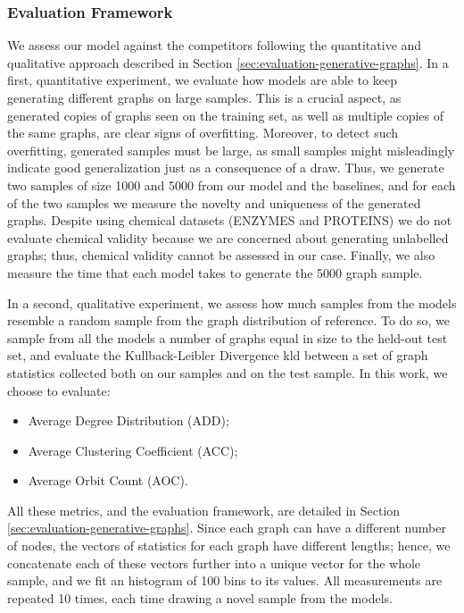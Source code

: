 \subsubsection*{Evaluation Framework}
We assess our model against the competitors following the quantitative and qualitative approach described in Section \ref{sec:evaluation-generative-graphs}. In a first, quantitative experiment, we evaluate how models are able to keep generating different graphs on large samples. This is a crucial aspect, as generated copies of graphs seen on the training set, as well as multiple copies of the same graphs, are clear signs of overfitting. Moreover, to detect such overfitting, generated samples must be large, as small samples might misleadingly indicate good generalization just as a consequence of a  draw. Thus, we generate two samples of size 1000 and 5000 from our model and the baselines, and for each of the two samples we measure the novelty and uniqueness of the generated graphs. Despite using chemical datasets (ENZYMES and PROTEINS) we do not evaluate chemical validity because we are concerned about generating unlabelled graphs; thus, chemical validity cannot be assessed in our case. Finally, we also measure the time that each model takes to generate the 5000 graph sample.

In a second, qualitative experiment, we assess how much samples from the models resemble a random sample from the graph distribution of reference. To do so, we sample from all the models a number of graphs equal in size to the held-out test set, and evaluate the Kullback-Leibler Divergence \gls{kld} between a set of graph statistics collected both on our samples and on the test sample. In this work, we choose to evaluate:
\begin{itemize}
    \item Average Degree Distribution (ADD);
    \item Average Clustering Coefficient (ACC);
    \item Average Orbit Count (AOC).
\end{itemize}
All these metrics, and the evaluation framework, are detailed in Section \ref{sec:evaluation-generative-graphs}. Since each graph can have a different number of nodes, the vectors of statistics for each graph have different lengths; hence, we concatenate each of these vectors further into a unique vector for the whole sample, and we fit an histogram of 100 bins to its values. All measurements are repeated 10 times, each time drawing a novel sample from the models.

